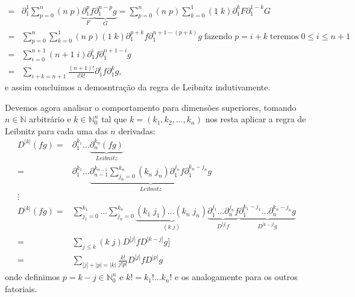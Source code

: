 \documentclass{article}
\begin{document}
\begin{enumerate}
$$\begin{aligned}
		= & \partial^{1}_{1} \sum_{p=0}^{n} (n \; p) \underbrace{\partial^{p}_{1} f}_{F}  \underbrace{\partial^{n-p}_{1} g}_{G} = \sum_{p=0}^{n} (n \; p) \sum_{k=0}^{1} (1 \; k)\partial^{k}_{1} F  \partial^{1-k}_{1} G \\
		= & \sum_{p=0}^{n} \sum_{k=0}^{1} (n \; p) (1 \; k)\partial^{p+k}_{1} f  \partial^{n+1-(p+k)}_{1} g \; \text{fazendo} \; p = i+k \; \text{teremos} \; 0 \leq i \leq n+1 \\
		= & \sum_{i=0}^{n+1} (n+1 \; i) \partial^{i}_{1} f  \partial^{n+1-i}_{1} g \\
		= & \sum_{i+k=n+1} \frac{(n+1)!}{i!k!}\partial^{i}_{1} f  \partial^{k}_{1} g,
		\end{aligned}
		$$
		e assim concluimos a demosntração da regra de Leibnitz indutivamente.
		
		Devemos agora analisar o comportamento para dimensões superiores, tomando $n \in \mathbb{N}$ arbitrário e $k \in \mathbb{N}^{n}_{0}$ tal que $k = (k_{1}, k_{2}, \dots, k_{n})$ nos resta aplicar a regra de Leibnitz para cada uma das $n$ derivadas:
		$$
		\begin{aligned}
		D^{|k|} (fg) 
		= & \partial^{k_1}_{1} \dots \underbrace{\partial^{k_n}_{n}(fg)}_{Leibnitz} \\
		= & \partial^{k_1}_{1} \dots \underbrace{ \partial^{k_{n-1}}_{n-1} \sum_{j_{n}=0}^{k_{n}} (k_{n} \; j_{n}) \partial^{j_{n}}_{1} f  \partial^{k_{n}-j_{n}}_{1} g }_{Leibnitz}\\
		\vdots & \\
		D^{|k|} (fg) 
		= & \sum_{j_{1}=0}^{k_{1}} \dots \sum_{j_{n}=0}^{k_{n}} \underbrace{ (k_{1} \; j_{1}) \dots (k_{n} \; j_{n}) }_{(k \; j)} \underbrace{ \partial_{1}^{j_{1}} \dots \partial_{n}^{j_{n}}f }_{D^{|j|}f} \underbrace{ \partial_{1}^{k_{1}-j_{1}} \dots \partial_{n}^{k_{n}-j_{n}}g }_{D^{|k-j|}g} \\
		= & \sum_{j \leq k} (k \; j) D^{|j|}f D^{|k-j|}g] \\
		= & \sum_{|j| + |p| = |k|} \frac{k!}{j!p!} D^{|j|}f D^{|p|}g
		\end{aligned}
		$$
		onde definimos $p = k-j \in \mathbb{N}^{n}_{0}$ e $k! = k_{1}!...k_{n}!$ e os analogamente para os outros fatoriais.
	\end{enumerate}
	
	
\end{document}
